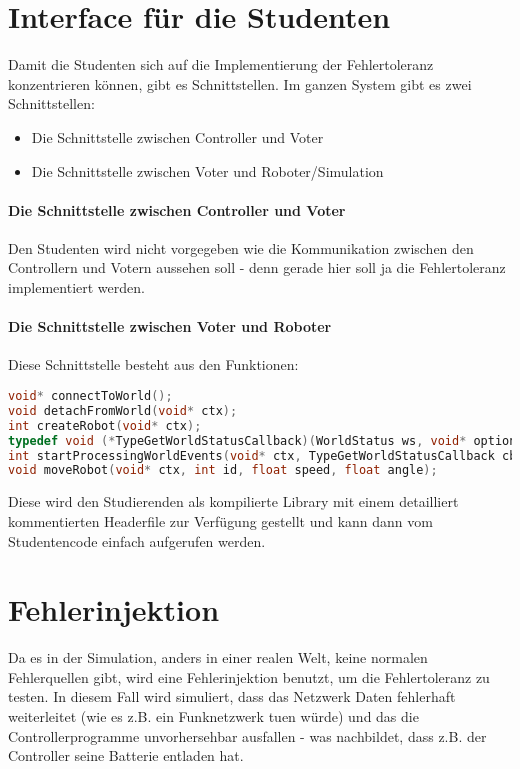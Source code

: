 \documentclass[
    12pt,
    bibliography=totoc,
    ngerman,
	enabledeprecatedfontcommands
]{scrartcl}
\begin{document}
\clearpage
\section{Interface f{\"{u}}r die Studenten}\label{interface}
Damit die Studenten sich auf die Implementierung der Fehlertoleranz konzentrieren k{\"{o}}nnen, gibt es Schnittstellen.
Im ganzen System gibt es zwei Schnittstellen:
\begin{itemize}
\item Die Schnittstelle zwischen Controller und Voter
\item Die Schnittstelle zwischen Voter und Roboter/Simulation
\end{itemize}

\paragraph{Die Schnittstelle zwischen Controller und Voter} Den Studenten wird nicht vorgegeben wie die Kommunikation zwischen den Controllern und Votern aussehen soll - denn gerade hier soll ja die Fehlertoleranz implementiert werden.

\paragraph{Die Schnittstelle zwischen Voter und Roboter} Diese Schnittstelle besteht aus den Funktionen:
\begin{lstlisting}[frame=single, language=c] 
void* connectToWorld();
void detachFromWorld(void* ctx);
int createRobot(void* ctx);
typedef void (*TypeGetWorldStatusCallback)(WorldStatus ws, void* optional);
int startProcessingWorldEvents(void* ctx, TypeGetWorldStatusCallback cb, void* optional);
void moveRobot(void* ctx, int id, float speed, float angle);
\end{lstlisting}

Diese wird den Studierenden als kompilierte Library mit einem detailliert kommentierten Headerfile zur Verf{\"{u}}gung gestellt und kann
dann vom Studentencode einfach aufgerufen werden.

\clearpage
\section{Fehlerinjektion}
Da es in der Simulation, anders in einer realen Welt, keine normalen Fehlerquellen gibt, wird eine Fehlerinjektion benutzt, um die Fehlertoleranz zu testen.
In diesem Fall wird simuliert, dass das Netzwerk Daten fehlerhaft weiterleitet (wie es z.B. ein Funknetzwerk tuen w{\"{u}}rde) und das die Controllerprogramme
unvorhersehbar ausfallen - was nachbildet, dass z.B. der Controller seine Batterie entladen hat.
\end{document}
